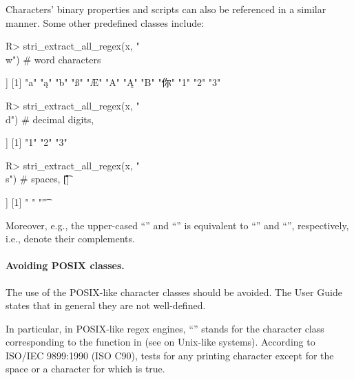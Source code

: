 \documentclass[nojss]{jss}\usepackage[]{graphicx}\usepackage[]{color}
\begin{document}
Characters' binary properties and scripts can also be referenced in a similar manner.
Some other predefined classes include:

\begin{Schunk}
\begin{Sinput}
R> stri_extract_all_regex(x, "\\w")     # word characters
\end{Sinput}
\begin{Soutput}
[[1]]
 [1] "a"  "ą"  "b"  "ß"  "Æ"  "A"  "Ą"  "B"  "你" "1"  "2"  "3"
\end{Soutput}
\begin{Sinput}
R> stri_extract_all_regex(x, "\\d")     # decimal digits, 
\end{Sinput}
\begin{Soutput}
[[1]]
[1] "1" "2" "3"
\end{Soutput}
\begin{Sinput}
R> stri_extract_all_regex(x, "\\s")     # spaces, [\t\n\f\r{}]
\end{Sinput}
\begin{Soutput}
[[1]]
[1] " "  "\t"
\end{Soutput}
\end{Schunk}

Moreover, e.g., the upper-cased ``'' and
``'' is equivalent to
``'' and
``\code{[\^{}\textbackslash{}w]}'', respectively, i.e.,
denote their complements.




\paragraph{Avoiding POSIX classes.}
The use of the POSIX-like character classes should be avoided.
The  User Guide states that in general they are not well-defined.

In particular, in POSIX-like regex engines, ``\code{[:punct:]}''
stands for the character class corresponding to the 
function in  (see  on Unix-like systems).
According to ISO/IEC 9899:1990 (ISO C90),  tests for
any printing character except for the space or a character for which 
is true.
\end{document}
